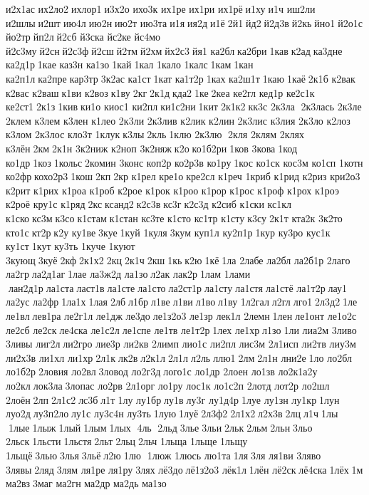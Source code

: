 и2х1ас 
их2ло2 ихлор1 и3х2о 	ихо3к 	их1ре 	их1ри 	их1рё и1ху и1ч 	иш2ли 	и2шлы и2шт ию4л ию2н ию2т 	ию3та и1я ия2д и1ё 2й1 йд2 й2д3в й2кь йно1 й2о1с 	йо2тр йп2л й2сб 	й3ска 	йс2ке 	йс4мо 
й2с3му й2сн й2с3ф й2сш й2тм й2хм йх2с3 йя1 	ка2бл ка2бри 1кав к2ад ка3дне 
ка2д1р 1кае 	каз3н 	ка1зо 1кай 1кал  	1кало 	1калс 1кам 1кан 
ка2п1л ка2пре кар3тр 3к2ас 	ка1ст 1кат 
ка1т2р 1ках 
ка2ш1т 1каю 1каё 2к1б 	к2вак 	к2вас 	к2ваш к1ви 	к2воз к1ву 2кг 2к1д кда2 1ке 2кеа 	ке2гл 	кед1р 
ке2с1к 
ке2ст1 2к1з 1кив ки1о 	киос1 	ки2пл ки1с2ни 1кит 2к1к2 кк3с 	2к3ла  2к3лась 	2к3ле  	2клем 
к3лем  	к3лен 	к1лео 	2к3ли  
2к3лив 	к2лик 	к2лин 
2к3лис 	к3лия 	2к3ло  	к2лоз 	к3лом 
2к3лос 	кло3т 	1клук к3лы 2кль 1клю 	2к3лю  2кля  	2клям 	2клях 	к3лён 2км 2к1н 
3к2ниж 	к2ноп 
3к2няж к2о ко1б2ри 1ков 	3кова 1код 	ко1др 1коз 1кольс 2комин 	3конс 	коп2р 
ко2р3в 	ко1ру 1кос 	ко1ск 	кос3м 	ко1сп 	1котн 	ко2фр кохо2р3 1кош 2кп 2кр  	к1рел 	кре1о кре2сл 	к1реч 	1криб 	к1рид 	к2риз 
кри2о3 	к2рит 	к1рих 	к1роа 	к1роб 	к2рое 	к1рок 	к1роо 	к1рор 	к1рос 	к1роф 	к1рох 	к1роэ 	к2роё 	кру1с 	к1ряд 2кс ксанд2 к2с3в кс3г к2с3д 	к2сиб 	к1ски 	кс1кл 	к1ско кс3м к3со к1стам к1стан 	кс3те 	к1сто 	кс1тр 	к1сту к3су 2к1т 	кта2к 	3к2то  	кто1с кт2р к2у 	ку1ве 3куе 1куй 	1куля 3кум 	куп1л 
ку2п1р 1кур 	ку3ро 	кус1к 	ку1ст 1кут 	ку3ть 	1куче 	1куют 	3кующ 3куё 2кф 2к1х2 2кц 2к1ч 2кш 1кь к2ю 1кё 1ла  	2лабе 	ла2бл 
ла2б1р 	2лаго 	ла2гр ла2д1аг 1лае 
ла3ж2д 	ла1зо л2ак 	лак2р 1лам  
1лами  лан2д1р ла1ста ласт1в ла1сте ла1сто ла2ст1р ла1сту ла1стя ла1стё 
ла1т2р лау1 	ла2ус 	ла2фр 1ла1х 1лая 2лб л1бр л1ве л1ви л1во л1ву 
1л2гал л2гл лго1 2л3д2 1ле  	ле1вл лев1ра 
ле2г1л 	ле1дж 	ле3до ле1з2о3 	ле1зр 	лек1л 	2лемн 1лен ле1онт 
ле1о2с 	ле2сб 	ле2ск ле4ска 
ле1с2л ле1спе 	ле1тв 
ле1т2р 1лех 	ле1хр л1зо 1ли 	лиа2м 	3ливо 	3ливы 	лиг2л ли2гро 	лие3р 	ли2кв 	2лимп 	лио1с 	ли2пл 	лис3м 
2л1исп 	ли2тв 	лиу3м 
ли2х3в 	ли1хл 	ли1хр 2л1к лк2в л2к1л 2л1л л2ль ллю1 2лм 2л1н 	лни2е 1ло 	ло2бл 
ло1б2р 2ловия 	ло2вл 3ловод 
ло2г3д лого1с 	ло1др 	2лоен 	ло1зв 
ло2к1а2у 	ло2кл лок3ла 3лопас 	ло2рв 
2л1орг 	ло1ру 	лос1к 
ло1с2п 	2лотд 	лот2р 	ло2шл 	2лоён 2лп 2л1с2 лс3б л1т 1лу  	лу1бр лу1в лу3г 
лу1д4р 1луе 	лу1зн 	лу1кр 1лун 	луо2д лу3п2ло лу1с 
лу3с4н 	лу3ть 1лую 1луё 2л3ф2 2л1х2 л2х3в 2лц л1ч 1лы  1лые 1лыж 1лый 1лым 1лых  4ль  2льд 3лье 3льи 2льк 2льм 2льн 3льо 	2льск 1льсти 1льстя 2льт 2льц 2льч 	1льща 	1льще 	1льщу 	1льщё 3лью 3лья 3льё л2ю 1лю  1люж 	1люсь 	лю1та 1ля 3ля  	ля1ви 	3ляво 	3лявы 2ляд 3лям 	ля1ре 	ля1ру 3лях 	лё3до лё1з2о3 	лёк1л 1лён 	лё2ск лё4ска 1лёх 1м 	ма2вз 3маг 	ма2гн 	ма2др 	ма2дь 	ма1зо 
